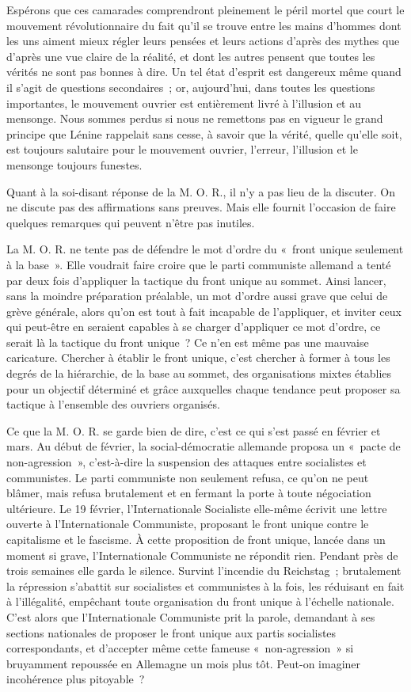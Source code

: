 \documentclass[french,twoside]{book} %
\begin{document}
Espérons que ces camarades comprendront pleinement le péril mortel que court le mouvement révolutionnaire du fait qu'il se trouve entre les mains d'hommes dont les uns aiment mieux régler leurs pensées et leurs actions d'après des mythes que d'après une vue claire de la réalité, et dont les autres pensent que toutes les vérités ne sont pas bonnes à dire. Un tel état d'esprit est dangereux même quand il s'agit de questions secondaires ; or, aujourd'hui, dans toutes les questions importantes, le mouvement ouvrier est entièrement livré à l'illusion et au mensonge. Nous sommes perdus si nous ne remettons pas en vigueur le grand principe que Lénine rappelait sans cesse, à savoir que la vérité, quelle qu'elle soit, est toujours salutaire pour le mouvement ouvrier, l'erreur, l'illusion et le mensonge toujours funestes.\par
Quant à la soi-disant réponse de la M. O. R., il n'y a pas lieu de la discuter. On ne discute pas des affirmations sans preuves. Mais elle fournit l'occasion de faire quelques remarques qui peuvent n'être pas inutiles.\par
La M. O. R. ne tente pas de défendre le mot d'ordre du « front unique seulement à la base ». Elle voudrait faire croire que le parti communiste allemand a tenté par deux fois d'appliquer la tactique du front unique au sommet. Ainsi lancer, sans la moindre préparation préalable, un mot d'ordre aussi grave que celui de grève générale, alors qu'on est tout à fait incapable de l'appliquer, et inviter ceux qui peut-être en seraient capables à se charger d'appliquer ce mot d'ordre, ce serait là la tactique du front unique ? Ce n'en est même pas une mauvaise caricature. Chercher à établir le front unique, c'est chercher à former à tous les degrés de la hiérarchie, de la base au sommet, des organisations mixtes établies pour un objectif déterminé et grâce auxquelles chaque tendance peut proposer sa tactique à l'ensemble des ouvriers organisés.\par
Ce que la M. O. R. se garde bien de dire, c'est ce qui s'est passé en février et mars. Au début de février, la social-démocratie allemande proposa un « pacte de non-agression », c'est-à-dire la suspension des attaques entre socia­listes et communistes. Le parti communiste non seulement refusa, ce qu'on ne peut blâmer, mais refusa brutalement et en fermant la porte à toute négocia­tion ultérieure. Le 19 février, l'Internationale Socialiste elle-même écrivit une lettre ouverte à l'Internationale Communiste, proposant le front unique contre le capitalisme et le fascisme. À cette proposition de front unique, lancée dans un moment si grave, l'Internationale Communiste ne répondit rien. Pendant près de trois semaines elle garda le silence. Survint l'incendie du Reichstag ; brutalement la répression s'abattit sur socialistes et communistes à la fois, les réduisant en fait à l'illégalité, empêchant toute organisation du front unique à l'échelle nationale. C'est alors que l'Internationale Communiste prit la parole, demandant à ses sections nationales de proposer le front unique aux partis socialistes correspondants, et d'accepter même cette fameuse « non-agres­sion » si bruyamment repoussée en Allemagne un mois plus tôt. Peut-on imaginer incohérence plus pitoyable ?\par
\end{document}
